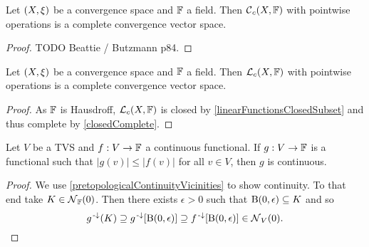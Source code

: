 \begin{proposition}
Let $\sSet{X, \xi}$ be a convergence space and $\mathbb{F}$ a field. Then $\operatorname{\mathcal{C}}_c(X, \mathbb{F})$ with pointwise operations is a complete convergence vector space.
\end{proposition}
\begin{proof}
TODO Beattie / Butzmann p84.
\end{proof}
\begin{corollary}
Let $\sSet{X, \xi}$ be a convergence space and $\mathbb{F}$ a field. Then $\operatorname{\mathcal{L}}_c(X, \mathbb{F})$ with pointwise operations is a complete convergence vector space.
\end{corollary}
\begin{proof}
As $\mathbb{F}$ is Hausdroff, $\operatorname{\mathcal{L}}_c(X, \mathbb{F})$ is closed by \ref{linearFunctionsClosedSubset} and thus complete by \ref{closedComplete}.
\end{proof}

\begin{lemma} \label{continuityDominatedFunctional}
Let $V$ be a TVS and $f:V\to \mathbb{F}$ a continuous functional. If $g:V\to \mathbb{F}$ is a functional such that $|g(v)|\leq |f(v)|$ for all $v\in V$, then $g$ is continuous.
\end{lemma}
\begin{proof}
We use \ref{pretopologicalContinuityVicinities} to show continuity. To that end take $K\in \operatorname{\mathcal{N}}_{\mathbb{F}}(0)$. Then there exists $\epsilon >0$ such that $\operatorname{B}(0,\epsilon)\subseteq K$ and so
\[ g^{{\text{\hspace{0.15em}-}\downarrow}}(K) \supseteq g^{\text{\hspace{0.15em}-}\downarrow}[\operatorname{B}(0,\epsilon)] \supseteq f^{\text{\hspace{0.15em}-}\downarrow}[\operatorname{B}(0,\epsilon)] \in \operatorname{\mathcal{N}}_V(0). \]
\end{proof}


